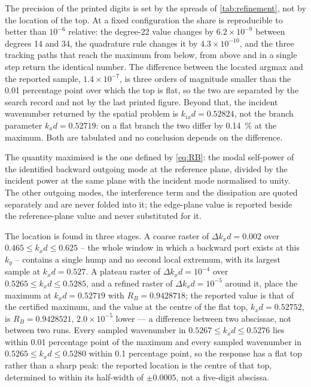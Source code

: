 The precision of the printed digits is set by the spreads of
\cref{tab:refinement}, not by the location of the top.  At a fixed
configuration the share is reproducible to better than $10^{-6}$ relative: the
degree-22 value changes by $6.2\times10^{-9}$ between degrees 14 and 34, the
quadrature rule changes it by $4.3\times10^{-10}$, and the three tracking paths
that reach the maximum from below, from above and in a single step return the
identical number.  The difference between the located argmax and the reported
sample, $1.4\times10^{-7}$, is three orders of magnitude smaller than the
\SI{0.01}{} percentage point over which the top is flat, so the two are
separated by the search record and not by the last printed figure.
Beyond that, the incident wavenumber returned by the spatial problem is
$k_{ix}d=0.52824$, not the branch parameter $k_xd=0.52719$: on a flat branch the
two differ by \SI{0.14}{\percent} at the maximum.  Both are tabulated and no
conclusion depends on the difference.


The quantity maximised is the one defined by \eqref{eq:RB}: the modal self-power
of the identified backward outgoing mode at the reference plane, divided by the
incident power at the same plane with the incident mode normalised to unity.
The other outgoing modes, the interference term and the dissipation are quoted
separately and are never folded into it; the edge-plane value is reported beside
the reference-plane value and never substituted for it.

The location is found in three stages.  A coarse raster of
$\Delta k_xd=0.002$ over $0.465\le k_xd\le0.625$ -- the whole window in which a
backward port exists at this $k_y$ -- contains a single hump and no second local
extremum, with its largest sample at $k_xd=0.527$.  A plateau raster of
$\Delta k_xd=10^{-4}$ over $0.5265\le k_xd\le0.5285$, and a refined raster of
$\Delta k_xd=10^{-5}$ around it, place the maximum at
$k_xd=0.52719$ with $R_B=0.9428718$; the reported value is that of the
certified maximum, and the value at the centre of the flat top, $k_xd=0.52752$,
is $R_B=0.9428521$, $2.0\times10^{-5}$ lower --- a difference between two
abscissae, not between two runs.  Every sampled wavenumber in
$0.5267\le k_xd\le0.5276$ lies within \SI{0.01}{} percentage point of the
maximum and every sampled wavenumber in $0.5265\le k_xd\le0.5280$ within
\SI{0.1}{} percentage point, so the response has a flat top rather than a sharp
peak: the reported location is the centre of that top, determined to within its
half-width of $\pm0.0005$, not a five-digit abscissa.

